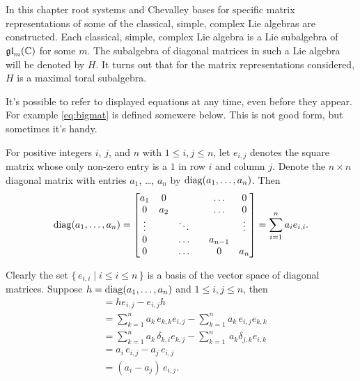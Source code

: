 \chapter{\MyChapTwo}



In this chapter root systems and Chevalley bases for specific matrix
representations of some of the classical, simple, complex Lie algebras are
constructed. Each classical, simple, complex Lie algebra is a Lie subalgebra
of $\mathfrak {gl}_m({\mathbb C})$ for some $m$. The subalgebra of diagonal matrices in such
a Lie algebra will be denoted by $H$. It turns out that for the matrix
representations considered, $H$ is a maximal toral subalgebra.

It's possible to refer to displayed equations at any time, even before they
appear. For example \cref{eq:bigmat} is defined somewere below. This is not
good form, but sometimes it's handy.

For positive integers $i$, $j$, and $n$ with $1\leq i,j\leq n$, let
$e_{i,j}$ denotes the square matrix whose only non-zero entry is a $1$ in
row $i$ and column $j$.  Denote the $n\times n$ diagonal matrix with entries
$a_1$, \dots, $a_n$ by ${\operatorname{diag}( a_1,\dots,a_n)}$. Then
\[
{\operatorname{diag}( a_1,\dots,a_n)}=
\begin{bmatrix}
  a_1&0&&&\dots&0 \\ 0&a_2&&&\dots&0 \\
  \vdots&&\ddots&&&\vdots \\ 0&&\dots&&a_{n-1}& \\ 0&&\dots&&0 &a_n
\end{bmatrix}
= \sum_{i=1}^n a_i e_{i,i}.
\]

Clearly the set $\{\, e_{i,i}\mid i\leq i\leq n\,\}$ is a basis of the
vector space of diagonal matrices. Suppose $h={\operatorname{diag}(a_1,\dots,a_n)}$ and $1\leq
i,j\leq n$, then
\begin{align*} 
  [h, e_{i,j}] &= he_{i,j} -e_{i,j} h\\
  &= \sum_{k=1}^n a_k\,e_{k,k} e_{i,j} -\sum_{k=1}^n a_k\, e_{i,j}e_{k,k}\\
  &= \sum_{k=1}^n a_k\, \delta_{k,i}e_{k,j} - \sum_{k=1}^n \, a_k
  \delta_{j,k} e_{i,k} \\
  &= a_i\, e_{i,j} - a_j\, e_{i,j}\\
  &= (a_i-a_j)\, e_{i,j}.
\end{align*}


